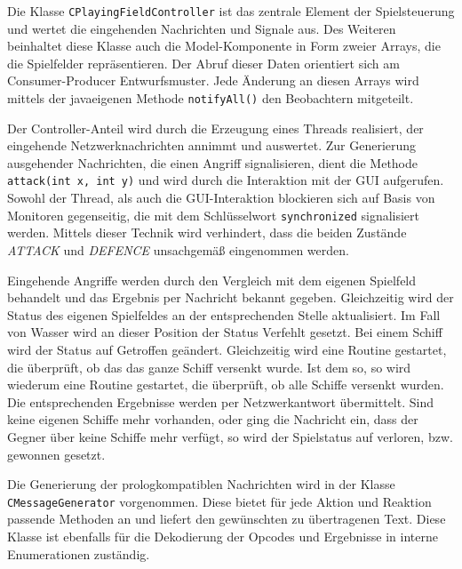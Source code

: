 Die Klasse \texttt{CPlayingFieldController} ist das zentrale Element der Spielsteuerung und wertet die eingehenden Nachrichten und Signale aus.
Des Weiteren beinhaltet diese Klasse auch die Model-Komponente in Form zweier Arrays, die die Spielfelder repräsentieren.
Der Abruf dieser Daten orientiert sich am Consumer-Producer Entwurfsmuster.
Jede Änderung an diesen Arrays wird mittels der javaeigenen Methode \texttt{notifyAll()} den Beobachtern mitgeteilt.

Der Controller-Anteil wird durch die Erzeugung eines Threads realisiert, der eingehende Netzwerknachrichten annimmt und auswertet.
Zur Generierung ausgehender Nachrichten, die einen Angriff signalisieren, dient die Methode \texttt{attack(int x, int y)} und wird durch die Interaktion mit der GUI aufgerufen.
Sowohl der Thread, als auch die GUI-Interaktion blockieren sich auf Basis von Monitoren gegenseitig, die mit dem Schlüsselwort \texttt{synchronized} signalisiert werden.
Mittels dieser Technik wird verhindert, dass die beiden Zustände \emph{ATTACK} und \emph{DEFENCE} unsachgemäß eingenommen werden.

Eingehende Angriffe werden durch den Vergleich mit dem eigenen Spielfeld behandelt und das Ergebnis per Nachricht bekannt gegeben.
Gleichzeitig wird der Status des eigenen Spielfeldes an der entsprechenden Stelle aktualisiert.
Im Fall von Wasser wird an dieser Position der Status Verfehlt gesetzt.
Bei einem Schiff wird der Status auf Getroffen geändert.
Gleichzeitig wird eine Routine gestartet, die überprüft, ob das das ganze Schiff versenkt wurde.
Ist dem so, so wird wiederum eine Routine gestartet, die überprüft, ob alle Schiffe versenkt wurden.
Die entsprechenden Ergebnisse werden per Netzwerkantwort übermittelt.
Sind keine eigenen Schiffe mehr vorhanden, oder ging die Nachricht ein, dass der Gegner über keine Schiffe mehr verfügt, so wird der Spielstatus auf verloren, bzw. gewonnen gesetzt.

Die Generierung der prologkompatiblen Nachrichten wird in der Klasse \texttt{CMessageGenerator} vorgenommen.
Diese bietet für jede Aktion und Reaktion passende Methoden an und liefert den gewünschten zu übertragenen Text.
Diese Klasse ist ebenfalls für die Dekodierung der Opcodes und Ergebnisse in interne Enumerationen zuständig.

